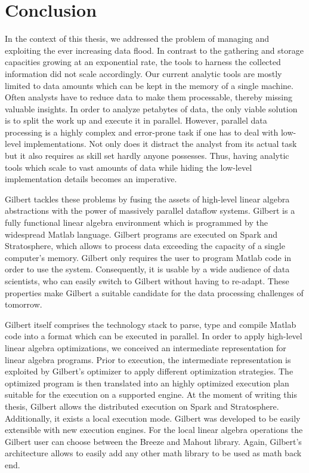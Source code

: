 \chapter{Conclusion}
\label{cha:conclusion}


In the context of this thesis, we addressed the problem of managing and exploiting the ever increasing data flood.
In contrast to the gathering and storage capacities growing at an exponential rate, the tools to harness the collected information did not scale accordingly.
Our current analytic tools are mostly limited to data amounts which can be kept in the memory of a single machine.
Often analysts have to reduce data to make them processable, thereby missing valuable insights.
In order to analyze petabytes of data, the only viable solution is to split the work up and execute it in parallel.
However, parallel data processing is a highly complex and error-prone task if one has to deal with low-level implementations.
Not only does it distract the analyst from its actual task but it also requires as skill set hardly anyone possesses.
Thus, having analytic tools which scale to vast amounts of data while hiding the low-level implementation details becomes an imperative.

Gilbert tackles these problems by fusing the assets of high-level linear algebra abstractions with the power of massively parallel dataflow systems.
Gilbert is a fully functional linear algebra environment which is programmed by the widespread Matlab language.
Gilbert programs are executed on Spark and Stratosphere, which allows to process data exceeding the capacity of a single computer's memory.
Gilbert only requires the user to program Matlab code in order to use the system.
Consequently, it is usable by a wide audience of data scientists, who can easily switch to Gilbert without having to re-adapt.
These properties make Gilbert a suitable candidate for the data processing challenges of tomorrow.

Gilbert itself comprises the technology stack to parse, type and compile Matlab code into a format which can be executed in parallel.
In order to apply high-level linear algebra optimizations, we conceived an intermediate representation for linear algebra programs.
Prior to execution, the intermediate representation is exploited by Gilbert's optimizer to apply different optimization strategies.
The optimized program is then translated into an highly optimized execution plan suitable for the execution on a supported engine.
At the moment of writing this thesis, Gilbert allows the distributed execution on Spark and Stratosphere.
Additionally, it exists a local execution mode.
Gilbert was developed to be easily extensible with new execution engines.
For the local linear algebra operations the Gilbert user can choose between the Breeze and Mahout library.
Again, Gilbert's architecture allows to easily add any other math library to be used as math back end.

